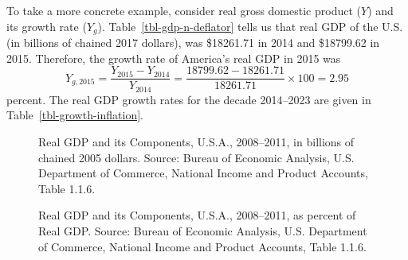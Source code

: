 \documentclass[
  letterpaper,
]{book}
\theoremstyle{plain}
\theoremstyle{remark}
\begin{document}
To take a more concrete example, consider real gross domestic product
(\(Y\)) and its growth rate (\(Y_g\)). Table~\ref{tbl-gdp-n-deflator}
tells us that real GDP of the U.S. (in billions of chained 2017
dollars), was \$18261.71 in 2014 and \$18799.62 in 2015. Therefore, the
growth rate of America's real GDP in 2015 was \[
Y_{g,2015}=\frac{Y_{2015}-Y_{2014}}{Y_{2014}} = \frac{18799.62-18261.71}{18261.71}\times 100 = 2.95
\] percent. The real GDP growth rates for the decade 2014--2023 are
given in Table~\ref{tbl-growth-inflation}.

\begin{figure}


\caption{\label{fig-gdp-components}Real GDP and its Components, U.S.A.,
2008--2011, in billions of chained 2005 dollars. Source: Bureau of
Economic Analysis, U.S. Department of Commerce, National Income and
Product Accounts, Table 1.1.6.}

\end{figure}%

\begin{figure}


\caption{\label{fig-gdp-components-percent}Real GDP and its Components,
U.S.A., 2008--2011, as percent of Real GDP. Source: Bureau of Economic
Analysis, U.S. Department of Commerce, National Income and Product
Accounts, Table 1.1.6.}

\end{figure}%
\end{document}
